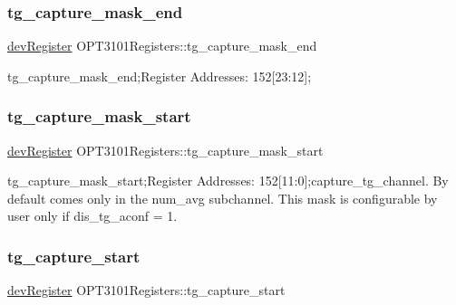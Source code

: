 \subsubsection{\texorpdfstring{tg\+\_\+capture\+\_\+mask\+\_\+end}{tg\_capture\_mask\_end}}
{\footnotesize\ttfamily \mbox{\hyperlink{classdev_register}{dev\+Register}} O\+P\+T3101\+Registers\+::tg\+\_\+capture\+\_\+mask\+\_\+end}



tg\+\_\+capture\+\_\+mask\+\_\+end;Register Addresses\+: 152\mbox{[}23\+:12\mbox{]}; 

\mbox{\label{class_o_p_t3101_registers_a4005716736ab2100c67ad96fd1ddb943}} 
\subsubsection{\texorpdfstring{tg\+\_\+capture\+\_\+mask\+\_\+start}{tg\_capture\_mask\_start}}
{\footnotesize\ttfamily \mbox{\hyperlink{classdev_register}{dev\+Register}} O\+P\+T3101\+Registers\+::tg\+\_\+capture\+\_\+mask\+\_\+start}



tg\+\_\+capture\+\_\+mask\+\_\+start;Register Addresses\+: 152\mbox{[}11\+:0\mbox{]};capture\+\_\+tg\+\_\+channel. By default comes only in the num\+\_\+avg subchannel. This mask is configurable by user only if dis\+\_\+tg\+\_\+aconf = \textquotesingle{}1\textquotesingle{}. 

\mbox{\label{class_o_p_t3101_registers_aae5d310de6a3870222106321e548b5a0}} 
\subsubsection{\texorpdfstring{tg\+\_\+capture\+\_\+start}{tg\_capture\_start}}
{\footnotesize\ttfamily \mbox{\hyperlink{classdev_register}{dev\+Register}} O\+P\+T3101\+Registers\+::tg\+\_\+capture\+\_\+start}



